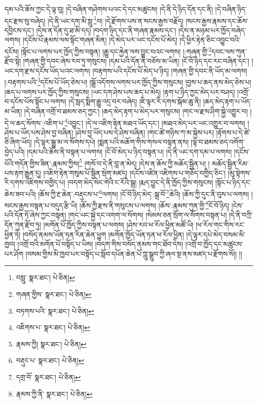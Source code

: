 དམ་པའི་ཆོས་ཀྱང་དེ་ལྟ་བུ། །དེ་བཞིན་གཤེགས་པའང་དེ་དང་མཚུངས། །དེ་ནི་དེ་ཉིད་དོན་དང་ནི། །དེ་བཞིན་ཉིད་དང་རྫས་སུ་བཞེད། །དེ་ནི་ཡང་དག་མི་སླུ་\footnote{བསླུ་  སྣར་ཐང་།  པེ་ཅིན། }བ། །དེ་རྫོགས་པས་ན་སངས་རྒྱས་བརྗོད། །སངས་རྒྱས་རྣམས་དང་ཆོས་དབྱིངས་དང་། །དེས་ན་དོན་དུ་ཐ་མི་དད། །བདག་ཉིད་དང་ནི་གཞན་རྣམས་དང་། །དེས་ན་མཉམ་པར་ཁྱོད་བཞེད་ལགས། །དངོས་པོ་རྣམས་ལས་སྟོང་གཞན་མིན། །དེ་མེད་པར་ཡང་དངོས་པོ་མེད། །དེ་ཕྱིར་རྟེན་ཅིང་འབྱུང་བའི་དངོས། །སྟོང་པ་ལགས་པར་ཁྱོད་ཀྱིས་བསྟན། །རྒྱུ་དང་རྐྱེན་ལས་བྱུང་བའང་ལགས། །:གཞན་གྱི་\footnote{གཞན་གྱིས་  སྣར་ཐང་།  པེ་ཅིན། }དབང་ལས་ཀུན་རྫོབ་སྟེ། །གཞན་གྱི་དབང་ཞེས་རབ་ཏུ་གསུངས། །དམ་པའི་དོན་ནི་བཅོས་མ་ཡིན། །ངོ་བོ་ཉིད་དང་རང་བཞིན་དང་། །ཡང་དག་རྫས་དངོས་ཡོད་པའང་ལགས། །བརྟགས་པའི་དངོས་པོ་མེད་པ་ཉིད། །གཞན་གྱི་དབང་ནི་ཡོད་མ་ལགས། །:བརྟགས་པའི་\footnote{བཏགས་པའི་  སྣར་ཐང་།  པེ་ཅིན། }དངོས་པོ་ཡོད་ཅེས་པ། །སྒྲོ་འདོགས་ལགས་པར་ཁྱོད་ཀྱིས་གསུངས། །བྱས་པ་ཆད་ནས་མེད་ཅེས་པ། །ཆད་པ་ལགས་པར་ཁྱོད་ཀྱིས་གསུངས། །ཡང་དག་ཤེས་པས་ཆད་པ་མེད། །རྟག་པ་ཉིད་ཀྱང་མེད་པར་བཤད། །འགྲོ་བ་དངོས་པོས་སྟོང་པ་ལགས། །དེ་སླད་སྨིག་རྒྱུ་འདྲ་བར་བཞེད། །ཇི་ལྟར་རི་དགས་སྐོམ་ཆུ་ནི། །ཆད་མེད་རྟག་པ་ཡོད་མ་ཡིན། །དེ་བཞིན་འགྲོ་བ་ཐམས་ཅད་ཀྱང་། །ཆད་མེད་རྟག་པ་མེད་པར་གསུངས། །གང་ལ་རྫས་ཤིག་སྐྱེ་འགྱུར་བ། །དེ་ལ་ཆད་སོགས་:འཇིག་པ་\footnote{འཇིགས་པ་  སྣར་ཐང་།  པེ་ཅིན། }འབྱུང་། །དེ་ལ་འཇིག་རྟེན་མཐའ་ཡོད་དང་། །མཐའ་མེད་པར་ཡང་འགྱུར་བ་ལགས། །ཤེས་པ་ཡོད་པས་ཤེས་བྱ་བཞིན། །ཤེས་བྱ་ཡོད་པས་དེ་ཤེས་བཞིན། །གང་ཚེ་གཉིས་ཀ་མ་སྐྱེས་པར། །རྟོགས་པ་དེ་ཚེ་ཅི་ཞིག་ཡོད། །དེ་ལྟར་སྒྱུ་མ་ལ་སོགས་དཔེ། །སྨན་པའི་མཆོག་གིས་གསལ་བསྟན་ནས། །ལྟ་བ་ཐམས་ཅད་འགོག་བྱེད་པའི། །དམ་པའི་ཆོས་ནི་བསྟན་པ་ལགས། །ངོ་བོ་མེད་པ་ཉིད་བསྟན་པ། །དེ་ནི་ཡང་དག་དམ་པ་ལགས། །དངོས་པོའི་གདོན་གྱིས་ཟིན་:རྣམས་ཀྱིས།\footnote{རྣམས་ཀྱི།  སྣར་ཐང་།  པེ་ཅིན། } །གསོ་བ་དེ་ནི་བླ་ན་མེད། །དེས་ན་ཆོས་ཀྱི་མཆོད་སྦྱིན་པ། །
མཆོད་སྦྱིན་རིམ་པས་རྟག་རྒྱུན་དུ། །འཇིག་རྟེན་གསུམ་པོ་སྦྱིན་སྲེག་མཛད། །དངོས་འཛིན་འཇིགས་པ་གཅོད་བགྱིད་ཅིང་། །མུ་སྟེགས་རི་དགས་འཇིགས་བགྱིད་པ། །བདག་མེད་སེང་གེའི་ང་རོའི་སྒྲ། །རྨད་བྱུང་དེ་ནི་ཁྱོད་ཀྱིས་གསུངས། །སྟོང་པ་ཉིད་དང་ཆེས་ཟབ་པའི། །ཆོས་ཀྱི་རྔ་ཆེན་:བརྡུངས་པ་\footnote{བརྡུང་པ་  སྣར་ཐང་།  པེ་ཅིན། }ལགས། །ངོ་བོ་ཉིད་མེད་:སྒྲ་བོ་\footnote{དགྲ་བོ་  སྣར་ཐང་།  པེ་ཅིན། }ཆེའི། །ཆོས་ཀྱི་དུང་ནི་བུས་པ་ལགས། །སངས་རྒྱས་བསྟན་པ་བདུད་རྩི་ཡི། །ཆོས་ཀྱི་རྫས་ནི་གསུངས་པ་ལགས། །ཆོས་:རྣམས་ཀུན་གྱི་\footnote{རྣམས་ཀྱི་ནི་  སྣར་ཐང་།  པེ་ཅིན། }ངོ་བོ་ཉིད། །ངེས་པའི་དོན་ཏོ་ཞེས་ཀྱང་བསྟན། །གང་ཡང་སྐྱེ་དང་འགག་ལ་སོགས། །སེམས་ཅན་སྲོག་ལ་སོགས་བསྟན་པ། །དེ་ནི་བཀྲི་དོན་ཀུན་རྫོབ་ཏུ། །མགོན་པོ་ཁྱོད་ཀྱིས་བསྟན་པ་ལགས། །ཤེས་རབ་ཕ་རོལ་ཕྱིན་མཚོ་ཡི། །ཕ་རོལ་གང་གིས་རང་ཕྱིན་ཏེ། །བསོད་ནམས་ཡོན་ཏན་རིན་ཆེན་ཕྱུག །མགོན་ཁྱོད་ཡོན་ཏན་ཕ་རོལ་ཕྱིན། །དེ་ལྟར་དཔེ་མེད་བསམ་མི་ཁྱབ། །འགྲོ་བའི་མགོན་པོ་བསྟོད་པ་ཡིས། །བདག་གིས་བསོད་ནམས་གང་ཐོབ་དེས། །འགྲོ་བ་ཁྱོད་དང་མཚུངས་པར་ཤོག །བསམ་གྱིས་མི་ཁྱབ་པར་བསྟོད་པ་སློབ་དཔོན་ཆེན་པོ་ཀླུ་སྒྲུབ་ཀྱི་ཞལ་སྔ་ནས་མཛད་པ་རྫོགས་སོ།། །།